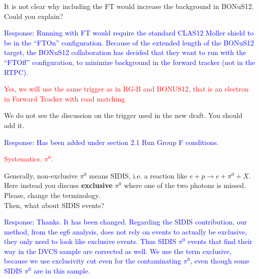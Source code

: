 \begin{itemize}
It is not clear why including the FT would increase the background in BONuS12.  
Could you explain?
  
  \textcolor{blue}{Response: Running with FT would require the standard CLAS12 
  Moller shield to be in the ``FTOn'' configuration. Because of the extended 
  length of the BONuS12 target, the BONuS12 collaboration has decided that they 
  want to run with the ``FTOff'' configuration, to minimize background in the 
  forward tracker (not in the RTPC).}
 



\textcolor{red}{
 \item Yes, we will use the same trigger as in RG-B and BONUS12, that is an 
    electron in Forward Tracker with road matching  }
 \newline
We do not see the discussion on the trigger used in the new draft. You should 
add it.


  \textcolor{blue}{Response: Has been added under section 2.1 Run Group F 
  conditions.}


  \textcolor{red}{
  \item Systematics. $\pi^0$.  }
  \newline
 
 Generally, non-exclusive $\pi^0$ means SIDIS, i.e. a reaction like 
 $e+p\rightarrow e+\pi^0+X$. Here instead you discuss \textbf{exclusive} 
 $\pi^0$ where one of the two photons is missed. Please, change the 
 terminology. \\ Then, what about SIDIS events?
  
  
  \textcolor{blue}{Response: Thanks. It has been changed. Regarding the SIDIS 
  contribution, our method, from the eg6 analysis, does not rely on events to actually
be exclusive, they only need to look like exclusive events. Thus SIDIS $\pi^0$ events that 
find their way in the DVCS sample are corrected as well. We use the term exclusive, because
we use exclusivity cut even for the contaminating $\pi^0$, even though some SIDIS $\pi^0$
are in this sample.}
  
 \end{itemize}
